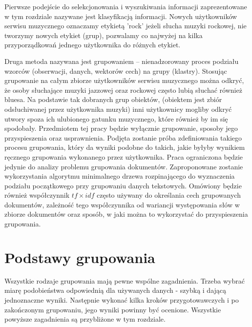 \documentclass{article}
\begin{document}
Pierwsze podejście do selekcjonowania i wyszukiwania informacji zaprezentowane w tym rozdziale nazywane jest klasyfikacją informacji. Nowych użytkowników serwisu muzycznego oznaczamy etykietą 'rock' jeżeli słucha muzyki rockowej, nie tworzymy nowych etykiet (grup), pozwalamy co najwyżej na kilka przyporządkowań jednego użytkownika do różnych etykiet. 

Druga metoda nazywana jest grupowaniem – nienadzorowany proces podziału wzorców (obserwacji, danych, wektorów cech) na grupy (klastry). Stosując grupowanie na całym zbiorze użytkowników serwisu muzycznego można odkryć, że osoby słuchające muzyki jazzowej oraz rockowej często lubią słuchać również bluesa. Na podstawie tak dobranych grup obiektów, (obiektem jest zbiór odsłuchiwanej przez użytkownika muzyki) inni użytkownicy mogliby odkryć utwory spoza ich ulubionego gatunku muzycznego, które również by im się spodobały.  Przedmiotem tej pracy będzie wyłącznie grupowanie, sposoby jego przyspieszenia oraz usprawnienia. Podjęta zostanie próba zdefiniowania takiego procesu grupowania, który da wyniki podobne do takich, jakie byłyby wynikiem ręcznego grupowania wykonanego przez użytkownika. Praca ograniczona będzie jedynie do analizy problemu grupowania dokumentów.
Zaproponowane zostanie wykorzystania algorytmu minimalnego drzewa rozpinającego do wyznaczenia podziału początkowego przy grupowaniu danych tekstowych. Omówiony będzie również współczynnik $tf \times idf$ często używany do określania cech grupowanych dokumentów, zależność tego współczynnika od wariancji występowania słów w zbiorze dokumentów oraz sposób, w jaki można to wykorzystać do przyspieszenia grupowania.

\newpage
\section{Podstawy grupowania}

Wszystkie rodzaje grupowania mają pewne wspólne zagadnienia. Trzeba wybrać miarę podobieństwa odpowiednią dla używanych danych - szybką i dającą jednoznaczne wyniki. Następnie wykonać kilka kroków przygotowawczych i po zakończonym grupowaniu, jego wyniki powinny być ocenione. Wszystkie powyższe zagadnienia są przybliżone w tym rozdziale.
\end{document}
